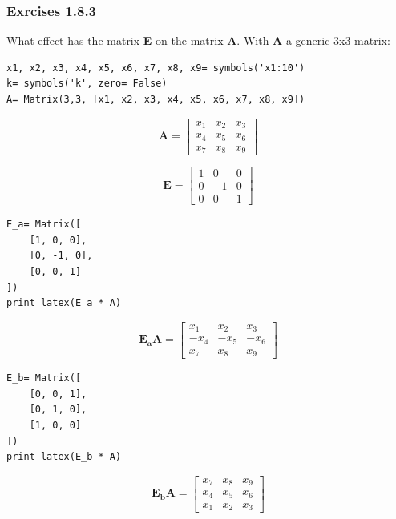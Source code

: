 \subsubsection{Exrcises 1.8.3}

What effect has the matrix \textbf{E} on the matrix \textbf{A}. With \textbf{A}
a generic 3x3 matrix:

\begin{verbatim}
x1, x2, x3, x4, x5, x6, x7, x8, x9= symbols('x1:10')
k= symbols('k', zero= False)
A= Matrix(3,3, [x1, x2, x3, x4, x5, x6, x7, x8, x9])
\end{verbatim}

\begin{equation}\label{eq:1_8_3A}
\mathbf{A} = \left[\begin{matrix}x_{1} & x_{2} & x_{3}\\x_{4} & x_{5} & x_{6}\\x_{7} & x_{8} & x_{9}\end{matrix}\right]
\end{equation}

\begin{equation}
\mathbf{E} = \left[\begin{matrix}1 & 0 & 0\\0 & -1 & 0\\0 & 0 & 1\end{matrix}\right]
\end{equation}

\begin{verbatim}
E_a= Matrix([
    [1, 0, 0],
    [0, -1, 0],
    [0, 0, 1]
])
print latex(E_a * A)
\end{verbatim}

\begin{equation}
\mathbf{E_aA} = \left[\begin{matrix}x_{1} & x_{2} & x_{3}\\- x_{4} & - x_{5} & - x_{6}\\x_{7} & x_{8} & x_{9}\end{matrix}\right]
\end{equation}

\begin{verbatim}
E_b= Matrix([
    [0, 0, 1],
    [0, 1, 0],
    [1, 0, 0]
])
print latex(E_b * A)
\end{verbatim}

\begin{equation}
\mathbf{E_bA} = \left[\begin{matrix}x_{7} & x_{8} & x_{9}\\x_{4} & x_{5} & x_{6}\\x_{1} & x_{2} & x_{3}\end{matrix}\right]
\end{equation}

